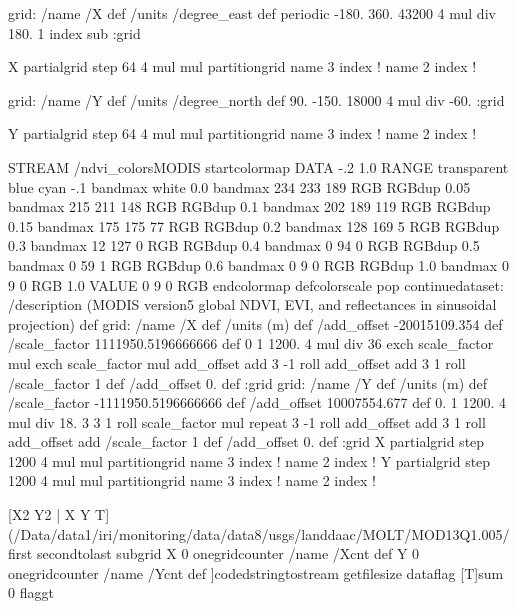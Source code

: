 
grid: 
  /name /X def
  /units /degree_east def
  periodic
  -180.
  360. 
  43200 4 mul div
  180.
  1 index sub
:grid

X partialgrid
step 64 4 mul mul partitiongrid
name 3 index !
name 2 index !

grid: 
  /name /Y def
  /units /degree_north def
  90.
  -150. 
  18000 4 mul div
  -60.
:grid

Y partialgrid
step 64 4 mul mul partitiongrid
name 3 index !
name 2 index !


\begin{ingrid}
STREAM
/ndvi_colorsMODIS {
startcolormap
DATA -.2 1.0 RANGE
transparent
blue
cyan -.1 bandmax
white 0.0 bandmax
234 233 189 RGB RGBdup 0.05 bandmax
215 211 148 RGB RGBdup 0.1 bandmax
202 189 119 RGB RGBdup 0.15 bandmax
175 175 77 RGB RGBdup 0.2 bandmax
128 169 5 RGB RGBdup 0.3 bandmax
12 127 0 RGB RGBdup 0.4 bandmax
0 94 0 RGB RGBdup 0.5 bandmax
0 59 1 RGB RGBdup 0.6 bandmax
0 9 0 RGB RGBdup 1.0 bandmax
0 9 0 RGB 1.0 VALUE
0 9 0 RGB
endcolormap } defcolorscale
pop
continuedataset:
/description (MODIS version5 global NDVI, EVI, and reflectances in sinusoidal projection) def
grid:
/name /X def
/units (m) def
/add_offset  -20015109.354 def
/scale_factor  1111950.5196666666 def
0 1 1200. 4 mul div 36
exch scale_factor mul exch scale_factor mul
add_offset add
3 -1 roll add_offset add 3 1 roll
/scale_factor 1 def
/add_offset 0. def
:grid
grid:
/name /Y def
/units (m) def
/scale_factor  -1111950.5196666666 def
/add_offset 10007554.677 def
0. 1 1200. 4 mul div 18.
3 { 3 1 roll scale_factor mul } repeat
3 -1 roll add_offset add 3 1 roll
add_offset add
/scale_factor 1 def
/add_offset 0. def
:grid
X partialgrid step 1200 4 mul mul partitiongrid
name 3 index !
name 2 index !
Y partialgrid step 1200 4 mul mul partitiongrid
name 3 index !
name 2 index !
\end{ingrid}

[X2
    Y2 |
    X Y T] (/Data/data1/iri/monitoring/data/data8/usgs/landdaac/MOLT/MOD13Q1.005/%
         first secondtolast subgrid
         X
          0 onegridcounter
          /name /Xcnt def
          Y
           0 onegridcounter
           /name /Ycnt def
           ]codedstringtostream
     getfilesize dataflag
     [T]sum
     0 flaggt

